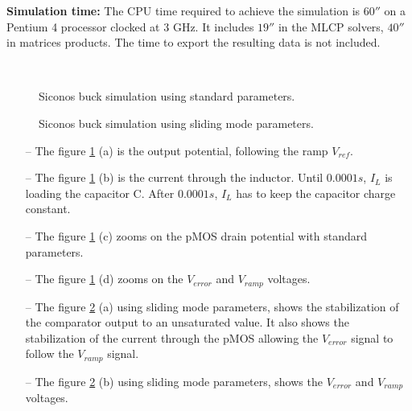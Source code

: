 {\bf Simulation time:} The CPU time required to achieve the simulation is $60 \second$ on a
Pentium 4 processor clocked at 3 GHz. It includes $19 \second$ in the MLCP solvers, $40 \second$ in
matrices products. The time to export the resulting data is not included.


\begin{figure}[!ht]
  \subfigure[$V_{load}$ ]{\label{fig:SICONOS_SIMU_BUCK_VLOAD}
        \resizebox{0.5\linewidth}{!}{}
  }\hspace{-2mm}
  \subfigure[$I_L$]  
  {\label{fig:SICONOS_SIMU_BUCK_IL} 
        \resizebox{0.5\linewidth}{!}{}
  } \\
  \hspace{-2mm}
 \caption{{\sc Siconos} buck simulation using standard parameters.}
\label{fig:figSimuBuck}
\end{figure}
\begin{figure}[!ht]
     \hspace{-2mm}
  \caption{{\sc Siconos} buck simulation using sliding mode parameters.}
\label{fig:figSimuBuck_Sliding}
\end{figure}


\begin{enumerate}
  \item[--] The figure \ref{fig:figSimuBuck} (a) is the output potential, following the ramp $V_{ref}$.
    \item[--] The figure \ref{fig:figSimuBuck} (b) is the current through the inductor. Until $0.0001s$, $I_L$
    is loading the capacitor C. After $0.0001s$, $I_L$ has to keep the capacitor charge constant.
    \item[--] The figure \ref{fig:figSimuBuck} (c) zooms on the pMOS drain potential with standard
    parameters.
    \item[--] The figure  \ref{fig:figSimuBuck} (d) zooms on the $V_{error}$ and $V_{ramp}$ voltages.
    \item[--] The figure  \ref{fig:figSimuBuck_Sliding} (a) using sliding mode parameters, shows the stabilization of the comparator output to an unsaturated value. It also shows
      the stabilization of the current through the pMOS allowing the $V_{error}$ signal to follow the $V_{ramp}$
    signal.    
    \item[--] The figure \ref{fig:figSimuBuck_Sliding} (b) using sliding mode parameters, shows the $V_{error}$ and $V_{ramp}$ voltages.
  \end{enumerate}




